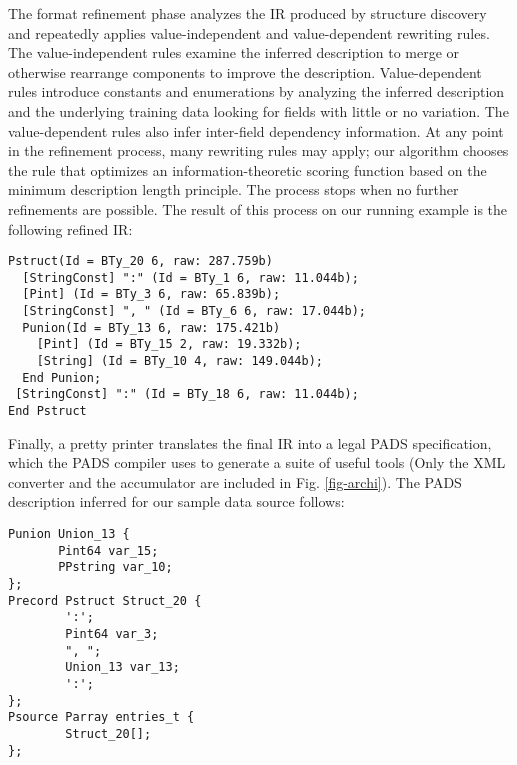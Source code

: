 \documentclass[preprint]{sig-alternate-sigmod08}
\begin{document}
The format refinement phase analyzes the IR produced by structure discovery
and repeatedly applies value-independent and value-dependent
rewriting rules. 
The value-independent rules examine the inferred description 
to merge or otherwise rearrange components to improve the description.
Value-dependent rules introduce constants and enumerations by
analyzing the inferred description and the underlying
training data looking for fields with little or no 
variation. The value-dependent rules also infer
inter-field dependency information.
At any point in the refinement process,
many rewriting rules may apply; our algorithm chooses the rule
that optimizes an information-theoretic
scoring function based on the minimum description length
principle. The process stops when no further refinements are possible.
The result of this process on our running example is the following
refined IR:

{\small
\begin{verbatim}
Pstruct(Id = BTy_20 6, raw: 287.759b)
  [StringConst] ":" (Id = BTy_1 6, raw: 11.044b);
  [Pint] (Id = BTy_3 6, raw: 65.839b);
  [StringConst] ", " (Id = BTy_6 6, raw: 17.044b);
  Punion(Id = BTy_13 6, raw: 175.421b)
    [Pint] (Id = BTy_15 2, raw: 19.332b);
    [String] (Id = BTy_10 4, raw: 149.044b);
  End Punion;
 [StringConst] ":" (Id = BTy_18 6, raw: 11.044b);
End Pstruct
\end{verbatim}
}

Finally, a pretty printer translates the final IR into a legal PADS 
specification,  which the PADS compiler uses to generate
a suite of useful tools (Only the XML converter and the accumulator are included
in Fig. \ref{fig-archi}).  The PADS description inferred for our
sample data source follows:

{\small
\begin{verbatim}
Punion Union_13 {
       Pint64 var_15;
       PPstring var_10;
};
Precord Pstruct Struct_20 {
        ':';
        Pint64 var_3;
        ", ";
        Union_13 var_13;
        ':';
};
Psource Parray entries_t {
        Struct_20[];
};
\end{verbatim}
}






\end{document}
